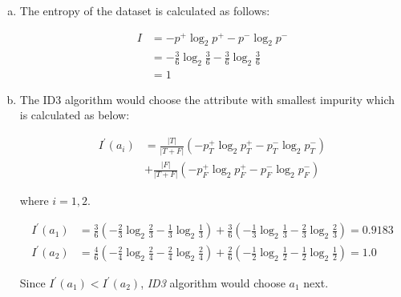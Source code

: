 \documentclass[12pt]{article}
\begin{document}
\begin{enumerate}[(a)]
  \item The entropy of the dataset is calculated as follows:
    \begin{center}
      \begin{align*}
        I&=-{ p }^{ + }\log _{ 2 }{ { p }^{ + } } -{ p }^{ - }\log _{ 2 }{ { p }^{ - } } \\
         &=-\frac { 3 }{ 6 } \log _{ 2 }{ \frac { 3 }{ 6 }  } -\frac { 3 }{ 6 } \log _{ 2 }{ \frac { 3 }{ 6 }  } \\
         &=1
      \end{align*}
    \end{center}
  \item The ID3 algorithm would choose the attribute with smallest impurity which is calculated as below:
    \begin{center}
      \begin{align*}
        { I }^{ \prime  }\left( { a }_{ i } \right) &=\frac { \left| T \right|  }{ \left| T+F \right|  } \left( -{ p }_{ T }^{ + }\log _{ 2 }{ { p }_{ T }^{ + } } -{ p }_{ T }^{ - }\log _{ 2 }{ { p }_{ T }^{ - } }  \right) \\
        &+ \frac { \left| F \right|  }{ \left| T+F \right|  } \left( -{ p }_{ F }^{ + }\log _{ 2 }{ { p }_{ F }^{ + }-{ p }_{ F }^{ - } } \log _{ 2 }{ { p }_{ F }^{ - } }  \right) 
      \end{align*}
    \end{center}
    where $i=1,2$.
    \begin{center}
      \begin{align*}
        { I }^{ \prime  }({ a }_{ 1 })&=\frac { 3 }{ 6 } \left( -\frac { 2 }{ 3 } \log _{ 2 }{ \frac { 2 }{ 3 }  } -\frac { 1 }{ 3 } \log _{ 2 }{ \frac { 1 }{ 3 }  }  \right) +\frac { 3 }{ 6 } \left( -\frac { 1 }{ 3 } \log _{ 2 }{ \frac { 1 }{ 3 } -\frac { 2 }{ 3 } \log _{ 2 }{ \frac { 2 }{ 3 }  }  }  \right) =0.9183 \\
        { I }^{ \prime  }({ a }_{ 2 })&=\frac { 4 }{ 6 } \left( -\frac { 2 }{ 4 } \log _{ 2 }{ \frac { 2 }{ 4 }  } -\frac { 2 }{ 4 } \log _{ 2 }{ \frac { 2 }{ 4 }  }  \right) +\frac { 2 }{ 6 } \left( -\frac { 1 }{ 2 } \log _{ 2 }{ \frac { 1 }{ 2 } -\frac { 1 }{ 2 } \log _{ 2 }{ \frac { 1 }{ 2 }  }  }  \right) =1.0
      \end{align*}
    \end{center}
Since ${ I }^{ \prime  }({ a }_{ 1 })<{ I }^{ \prime  }({ a }_{ 2 })$, \textit{ID3} algorithm would choose $a_1$ next.
\end{enumerate}
\end{document}
